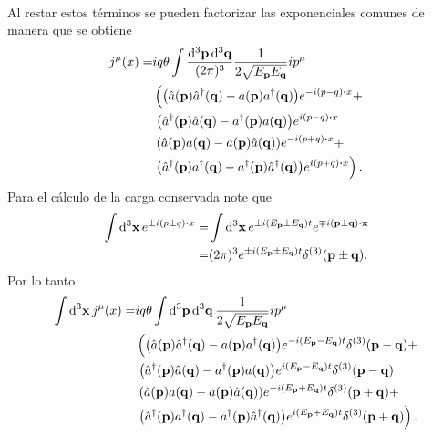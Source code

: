 \documentclass{article}
\begin{document}
\begin{enumerate}[(a)]
\begin{align}
\begin{split}
\end{split}
\end{align}
Al restar estos términos se pueden factorizar las exponenciales comunes de manera que se obtiene
\begin{align}
\begin{split}
j^\mu(x)=&iq\theta\int\frac{\dd[3]{\vb{p}}\dd[3]{\vb{q}}}{(2\pi)^3}\frac{1}{2\sqrt{E_{\vb{p}}E_{\vb{q}}}}ip^\mu\\
&\left(\qty(\hat{a}(\vb{p})\hat{a}^\dagger(\vb{q})-a(\vb{p})a^\dagger(\vb{q}))e^{-i(p-q)\vdot x}+\right.\\
&\left.\qty(\hat{a}^\dagger(\vb{p})\hat{a}(\vb{q})-a^\dagger(\vb{p})a(\vb{q}))e^{i(p-q)\vdot x}\right.\\
&\left.\qty(\hat{a}(\vb{p})a(\vb{q})-a(\vb{p})\hat{a}(\vb{q}))e^{-i(p+q)\vdot x}+\right.\\
&\left.\qty(\hat{a}^\dagger(\vb{p})a^\dagger(\vb{q})-a^\dagger(\vb{p})\hat{a}^\dagger(\vb{q}))e^{i(p+q)\vdot x}\right).
\end{split}
\end{align}
Para el cálculo de la carga conservada note que 
\begin{align}
\begin{split}
\int\dd[3]{\vb{x}}e^{\pm i(p\pm q)\vdot x}=&\int\dd[3]{\vb{x}}e^{\pm i(E_{\vb{p}}\pm E_{\vb{q}})t}e^{\mp i(\vb{p}\pm\vb{q})\vdot\vb{x}}\\
=&(2\pi)^3e^{\pm i(E_{\vb{p}}\pm E_{\vb{q}})t}\delta^{(3)}(\vb{p}\pm\vb{q}).
\end{split}
\end{align}
Por lo tanto
\begin{align}
\begin{split}
\int\dd[3]{\vb{x}}j^\mu(x)=&iq\theta\int\dd[3]{\vb{p}}\dd[3]{\vb{q}}\frac{1}{2\sqrt{E_{\vb{p}}E_{\vb{q}}}}ip^\mu\\
&\left(\qty(\hat{a}(\vb{p})\hat{a}^\dagger(\vb{q})-a(\vb{p})a^\dagger(\vb{q}))e^{-i(E_{\vb{p}}-E_{\vb{q}})t}\delta^{(3)}(\vb{p}-\vb{q})+\right.\\
&\left.\qty(\hat{a}^\dagger(\vb{p})\hat{a}(\vb{q})-a^\dagger(\vb{p})a(\vb{q}))e^{i(E_{\vb{p}}-E_{\vb{q}})t}\delta^{(3)}(\vb{p}-\vb{q})\right.\\
&\left.\qty(\hat{a}(\vb{p})a(\vb{q})-a(\vb{p})\hat{a}(\vb{q}))e^{-i(E_{\vb{p}}+E_{\vb{q}})t}\delta^{(3)}(\vb{p}+\vb{q})+\right.\\
&\left.\qty(\hat{a}^\dagger(\vb{p})a^\dagger(\vb{q})-a^\dagger(\vb{p})\hat{a}^\dagger(\vb{q}))e^{i(E_{\vb{p}}+E_{\vb{q}})t}\delta^{(3)}(\vb{p}+\vb{q})\right).

\end{split}
\end{align}
\end{enumerate}
\end{document}
